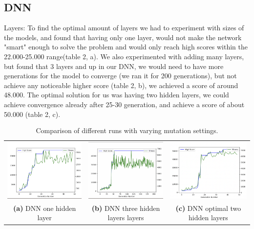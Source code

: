 \documentclass{article}
\begin{document}
\subsection{DNN}

Layers:
To find the optimal amount of layers we had to experiment with sizes of the models, and found that having only one layer, would not make the network "smart" enough to solve the problem and would only reach high scores within the 22.000-25.000 range(table 2, a). We also experimented with adding many layers, but found that 3 layers and up in our DNN, we would need to have more generations for the model to converge (we ran it for 200 generations), but not achieve any noticeable higher score (table 2, b), we achieved a score of around 48.000. The optimal solution for us was having two hidden layers, we could achieve convergence already after 25-30 generation, and achieve a score of about 50.000 (table 2, c). 
\begin{table}[h!]
    \centering
    \begin{tabular}{ccc} %
        \includegraphics[width=0.3\linewidth]{dnn1layer.png} &
        \includegraphics[width=0.3\linewidth]{dnn3layers.png} &
        \includegraphics[width=0.3\linewidth]{optimal-settings.png} \\
        \textbf{(a)} DNN one hidden layer & 
        \textbf{(b)} DNN three hidden layers layers  & 
        \textbf{(c)} DNN optimal two hidden layers \\
    \end{tabular}
    \caption{Comparison of different runs with varying mutation settings.}
    \label{tab:my_label}
\end{table}
\end{document}
